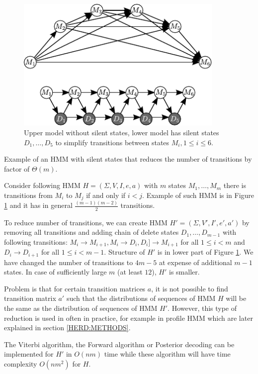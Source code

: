 \begin{figure}
\begin{center}
\includegraphics[width=10cm]{../figures/silent_removal.pdf}
\end{center}
\caption[Removal of silent state]{
Upper model without silent states, lower model has silent states $D_1, \dots, D_5$ to simplify 
transitions between states $M_i, 1\leq i\leq 6$.
}\label{FIGURE:SILENTREMOVE}
\end{figure}

\begin{example}
Example of an HMM with silent states that reduces the number of transitions by factor
of $\Theta(m)$.

Consider following HMM $H=(\Sigma,V,I,e,a)$ with $m$ states $M_1,\dots, M_m$
there is transitions from $M_i$ to $M_j$ if and only if $i<j$. Example of such
HMM is in Figure \ref{FIGURE:SILENTREMOVE} and it has in general
$\frac{(m-1)(m-2)}{2}$ transitions.

To reduce number of transitions, we can create HMM $H'=(\Sigma, V', I', e', a')$ by removing all
transitions and  adding chain of delete states $D_1,\dots, D_{m-1}$ with
following transitions: $M_i\to M_{i+1}, M_{i}\to D_{i}, D_{i}]\to M_{i+1}$ for
all $1\leq i<m$ and $D_{i}\to D_{i+1}$ for all $1\leq i<m-1$. Structure of $H'$
is in lower part of Figure \ref{FIGURE:SILENTREMOVE}. We have changed the
number of transitions to $4m-5$ at expense of additional $m-1$ states. In case
of sufficiently large $m$ (at least $12$), $H'$ is smaller. 

Problem is that for certain transition matrices $a$, it is not possible to find
transition matrix $a'$ such that the distributions of sequences of HMM $H$ will
be the same as the distribution of sequences of HMM $H'$. However, this type of
reduction is used in often in practice, for example in profile HMM
\cite{Durbin1998} which are later explained in section \ref{HERD:METHODS}.

The Viterbi algorithm, the Forward algorithm or Posterior decoding can be
implemented for $H'$ in $O(nm)$ time while these algorithm will have time
complexity $O(nm^2)$ for $H$.
\end{example}

